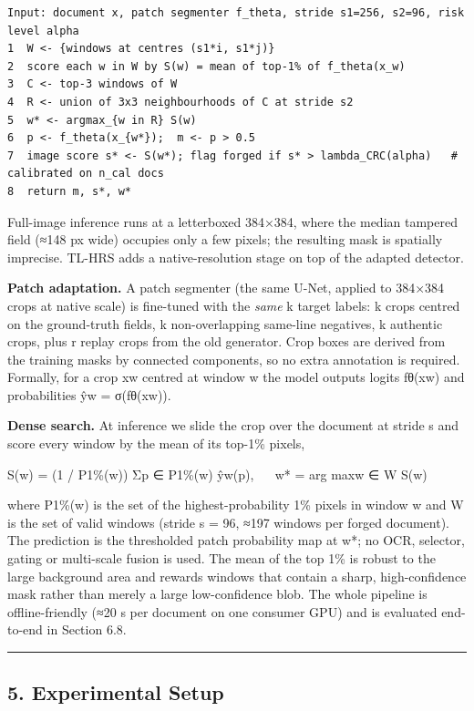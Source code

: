 \begin{verbatim}
Input: document x, patch segmenter f_theta, stride s1=256, s2=96, risk level alpha
1  W <- {windows at centres (s1*i, s1*j)}
2  score each w in W by S(w) = mean of top-1% of f_theta(x_w)
3  C <- top-3 windows of W
4  R <- union of 3x3 neighbourhoods of C at stride s2
5  w* <- argmax_{w in R} S(w)
6  p <- f_theta(x_{w*});  m <- p > 0.5
7  image score s* <- S(w*); flag forged if s* > lambda_CRC(alpha)   # calibrated on n_cal docs
8  return m, s*, w*
\end{verbatim}

Full-image inference runs at a letterboxed 384×384, where the median tampered field (≈148 px wide) occupies only a few pixels; the resulting mask is spatially imprecise. TL-HRS adds a native-resolution stage on top of the adapted detector.

\textbf{Patch adaptation.} A patch segmenter (the same U-Net, applied to 384×384 crops at native scale) is fine-tuned with the \emph{same} k target labels: k crops centred on the ground-truth fields, k non-overlapping same-line negatives, k authentic crops, plus r replay crops from the old generator. Crop boxes are derived from the training masks by connected components, so no extra annotation is required. Formally, for a crop xw centred at window w the model outputs logits fθ(xw) and probabilities ŷw = σ(fθ(xw)).

\textbf{Dense search.} At inference we slide the crop over the document at stride s and score every window by the mean of its top-1\% pixels,

S(w) = (1 / \textbar{}P1\%(w)\textbar) Σp ∈ P1\%(w) ŷw(p), ~~ w* = arg maxw ∈ W S(w)

where P1\%(w) is the set of the highest-probability 1\% pixels in window w and W is the set of valid windows (stride s = 96, ≈197 windows per forged document). The prediction is the thresholded patch probability map at w*; no OCR, selector, gating or multi-scale fusion is used. The mean of the top 1\% is robust to the large background area and rewards windows that contain a sharp, high-confidence mask rather than merely a large low-confidence blob. The whole pipeline is offline-friendly (≈20 s per document on one consumer GPU) and is evaluated end-to-end in Section 6.8.

\begin{center}\rule{0.5\linewidth}{0.5pt}\end{center}

\subsection{5. Experimental Setup}\label{experimental-setup}

